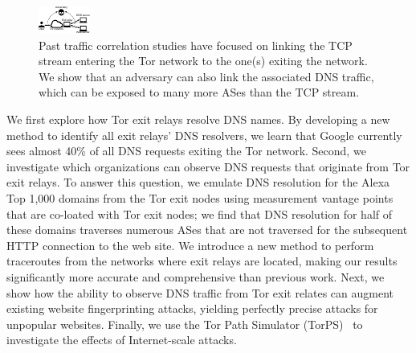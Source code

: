 \begin{figure}[t]
	\centering
	\includegraphics[width=0.65\linewidth]{figures/attack-concept.pdf}
	\caption{Past traffic correlation studies have focused on linking the TCP
		stream entering the Tor network to the one(s) exiting the network.  We
		show that an adversary can also link the associated DNS traffic, which
		can be exposed to many more ASes than the TCP stream.}
	\label{fig:overview}
\end{figure}

We first explore how Tor exit relays resolve DNS names.  By developing a
new method to identify all exit relays' DNS resolvers, we learn that Google
currently sees almost 40\% of all DNS requests exiting the Tor network.
Second, we investigate which organizations can observe
DNS requests that originate from Tor exit relays.  To answer this question, we emulate DNS
resolution for the Alexa Top 1,000 domains from the Tor exit nodes using
measurement vantage points that are co-loated with Tor exit nodes; we find that DNS
resolution for half of these domains traverses numerous ASes
that are not traversed for the subsequent HTTP connection to the web
site.
We introduce a new
method to perform traceroutes from the networks where
exit relays are located, making our results significantly more accurate and
comprehensive than previous work.
Next, we show how the ability to observe DNS traffic from Tor
exit relates can
augment existing website fingerprinting attacks,
yielding perfectly precise \name attacks for unpopular websites.
Finally, we use the Tor Path Simulator (TorPS)~\cite{TorPS} to investigate the
effects of Internet-scale \name attacks.

